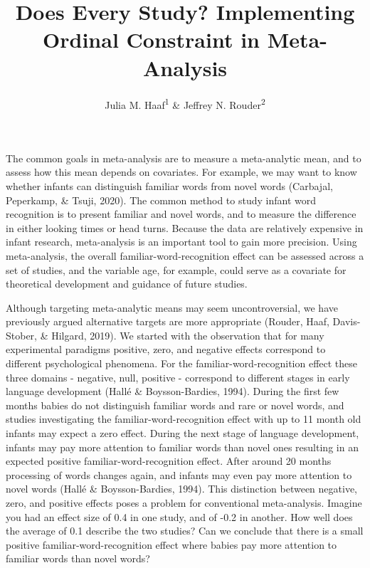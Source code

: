 \documentclass[english,,man]{apa6}
\title{Does Every Study? Implementing Ordinal Constraint in Meta-Analysis}
\author{Julia M. Haaf\textsuperscript{1} \& Jeffrey N. Rouder\textsuperscript{2}}
\date{}
\affiliation{\vspace{0.5cm}\textsuperscript{1} University of Amsterdam\\\textsuperscript{2} University of California-Irvine}
\begin{document}
\maketitle

The common goals in meta-analysis are to measure a meta-analytic mean, and to assess how this mean depends on covariates. For example, we may want to know whether infants can distinguish familiar words from novel words (Carbajal, Peperkamp, \& Tsuji, 2020). The common method to study infant word recognition is to present familiar and novel words, and to measure the difference in either looking times or head turns. Because the data are relatively expensive in infant research, meta-analysis is an important tool to gain more precision. Using meta-analysis, the overall familiar-word-recognition effect can be assessed across a set of studies, and the variable age, for example, could serve as a covariate for theoretical development and guidance of future studies.

Although targeting meta-analytic means may seem uncontroversial, we have previously argued alternative targets are more appropriate (Rouder, Haaf, Davis-Stober, \& Hilgard, 2019). We started with the observation that for many experimental paradigms positive, zero, and negative effects correspond to different psychological phenomena. For the familiar-word-recognition effect these three domains - negative, null, positive - correspond to different stages in early language development (Hallé \& Boysson-Bardies, 1994). During the first few months babies do not distinguish familiar words and rare or novel words, and studies investigating the familiar-word-recognition effect with up to 11 month old infants may expect a zero effect. During the next stage of language development, infants may pay more attention to familiar words than novel ones resulting in an expected positive familiar-word-recognition effect. After around 20 months processing of words changes again, and infants may even pay more attention to novel words (Hallé \& Boysson-Bardies, 1994). This distinction between negative, zero, and positive effects poses a problem for conventional meta-analysis. Imagine you had an effect size of 0.4 in one study, and of -0.2 in another. How well does the average of 0.1 describe the two studies? Can we conclude that there is a small positive familiar-word-recognition effect where babies pay more attention to familiar words than novel words?
\end{document}
